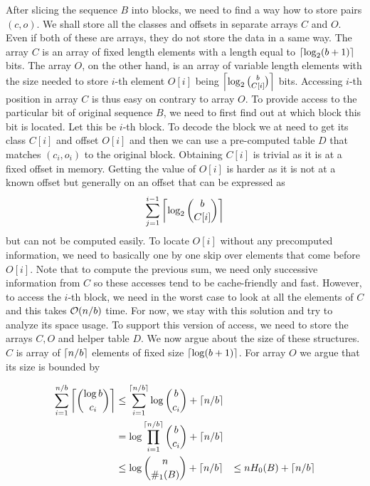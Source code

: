 After slicing the sequence $B$ into blocks, we need to find a way how to store pairs $(c, o)$.
We shall store all the classes and offsets in separate arrays $C$ and $O$. Even if both of these
are arrays, they do not store the data in a same way. The array $C$ is an array of fixed length
elements with a length equal to $\left\lceil \log_2(b+1) \right\rceil$ bits. The array $O$, on the other hand, is
an array of variable length elements with the size needed to store $i$-th element $O[i]$ being
$\left\lceil \log_2{b\choose C[i]} \right\rceil$ bits. Accessing $i$-th position in array $C$ is thus easy on
contrary to array $O$. To provide access to the particular bit of original sequence $B$, we
need to first find out at which block this bit is located. Let this be $i$-th block. To decode
the block we at need to get its class $C[i]$ and offset $O[i]$ and then we can use a pre-computed
table $D$ that matches $(c_i, o_i)$ to the original block. Obtaining $C[i]$ is trivial as it is at
a fixed offset in memory. Getting the value of $O[i]$ is harder as it is not at a known offset but
generally on an offset that can be expressed as $$\sum_{j=1}^{i-1} \left\lceil \log_2{b\choose C[i]} \right\rceil$$ but
can not be computed easily. To locate $O[i]$ without any precomputed information, we need to basically
one by one skip over elements that come before $O[i]$. Note that to compute the previous sum, we need
only successive information from $C$ so these accesses tend to be cache-friendly and fast. However,
to access the $i$-th block, we need in the worst case to look at all the elements of $C$ and this
takes $\mathcal{O}(n/b)$ time. For now, we stay with this solution and try to analyze its space usage. To
support this version of access, we need to store the arrays $C, O$ and helper table $D$. We now
argue about the size of these structures. $C$ is array of $\left\lceil n/b \right\rceil$ elements of fixed size
$\left\lceil \log(b+1) \right\rceil$. For array $O$ we argue that its size is bounded by

\begin{align*}
    \sum_{i=1}^{n/b} \left\lceil {\log b\choose c_i} \right\rceil
    &\leq \sum_{i=1}^{\left\lceil n/b \right\rceil} \log {b\choose c_i} + \left\lceil n/b \right\rceil \\
    &= \log\prod_{i=1}^{\left\lceil n/b \right\rceil} {b\choose c_i} + \left\lceil n/b \right\rceil \\
    &\leq \log{n\choose \#_1(B)} + \left\lceil n/b \right\rceil &\leq nH_0(B) + \left\lceil n/b \right\rceil
\end{align*}

